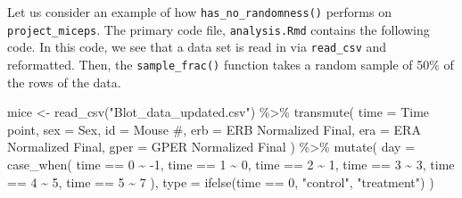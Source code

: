 \documentclass[12pt,twoside]{reedthesis}
\newenvironment{Shaded}{\begin{snugshade}}{\end{snugshade}}
\newcommand{\AttributeTok}[1]{\textcolor[rgb]{0.77,0.63,0.00}{#1}}
\newcommand{\DecValTok}[1]{\textcolor[rgb]{0.00,0.00,0.81}{#1}}
\newcommand{\FunctionTok}[1]{\textcolor[rgb]{0.00,0.00,0.00}{#1}}
\newcommand{\NormalTok}[1]{#1}
\newcommand{\OtherTok}[1]{\textcolor[rgb]{0.56,0.35,0.01}{#1}}
\newcommand{\SpecialCharTok}[1]{\textcolor[rgb]{0.00,0.00,0.00}{#1}}
\newcommand{\StringTok}[1]{\textcolor[rgb]{0.31,0.60,0.02}{#1}}
\begin{document}
Let us consider an example of how \texttt{has\_no\_randomness()} performs on \texttt{project\_miceps}. The primary code file, \texttt{analysis.Rmd} contains the following code. In this code, we see that a data set is read in via \texttt{read\_csv} and reformatted. Then, the \texttt{sample\_frac()} function takes a random sample of 50\% of the rows of the data.
\begin{Shaded}
\begin{Highlighting}[]
\NormalTok{mice }\OtherTok{\textless{}{-}} \FunctionTok{read\_csv}\NormalTok{(}\StringTok{"Blot\_data\_updated.csv"}\NormalTok{) }\SpecialCharTok{\%\textgreater{}\%}
  \FunctionTok{transmute}\NormalTok{(}
    \AttributeTok{time =} \StringTok{\textasciigrave{}}\AttributeTok{Time point}\StringTok{\textasciigrave{}}\NormalTok{,}
    \AttributeTok{sex =}\NormalTok{ Sex,}
    \AttributeTok{id =} \StringTok{\textasciigrave{}}\AttributeTok{Mouse \#}\StringTok{\textasciigrave{}}\NormalTok{,}
    \AttributeTok{erb =} \StringTok{\textasciigrave{}}\AttributeTok{ERB Normalized Final}\StringTok{\textasciigrave{}}\NormalTok{,}
    \AttributeTok{era =} \StringTok{\textasciigrave{}}\AttributeTok{ERA Normalized Final}\StringTok{\textasciigrave{}}\NormalTok{,}
    \AttributeTok{gper =} \StringTok{\textasciigrave{}}\AttributeTok{GPER Normalized Final}\StringTok{\textasciigrave{}}
\NormalTok{  ) }\SpecialCharTok{\%\textgreater{}\%}
  \FunctionTok{mutate}\NormalTok{(}
    \AttributeTok{day =} \FunctionTok{case\_when}\NormalTok{(}
\NormalTok{      time }\SpecialCharTok{==} \DecValTok{0} \SpecialCharTok{\textasciitilde{}} \SpecialCharTok{{-}}\DecValTok{1}\NormalTok{,}
\NormalTok{      time }\SpecialCharTok{==} \DecValTok{1} \SpecialCharTok{\textasciitilde{}} \DecValTok{0}\NormalTok{,}
\NormalTok{      time }\SpecialCharTok{==} \DecValTok{2} \SpecialCharTok{\textasciitilde{}} \DecValTok{1}\NormalTok{,}
\NormalTok{      time }\SpecialCharTok{==} \DecValTok{3} \SpecialCharTok{\textasciitilde{}} \DecValTok{3}\NormalTok{,}
\NormalTok{      time }\SpecialCharTok{==} \DecValTok{4} \SpecialCharTok{\textasciitilde{}} \DecValTok{5}\NormalTok{,}
\NormalTok{      time }\SpecialCharTok{==} \DecValTok{5} \SpecialCharTok{\textasciitilde{}} \DecValTok{7}
\NormalTok{    ),}
    \AttributeTok{type =} \FunctionTok{ifelse}\NormalTok{(time }\SpecialCharTok{==} \DecValTok{0}\NormalTok{, }\StringTok{"control"}\NormalTok{, }\StringTok{"treatment"}\NormalTok{)}
\NormalTok{  )}


\end{Highlighting}
\end{Shaded}
\end{document}
